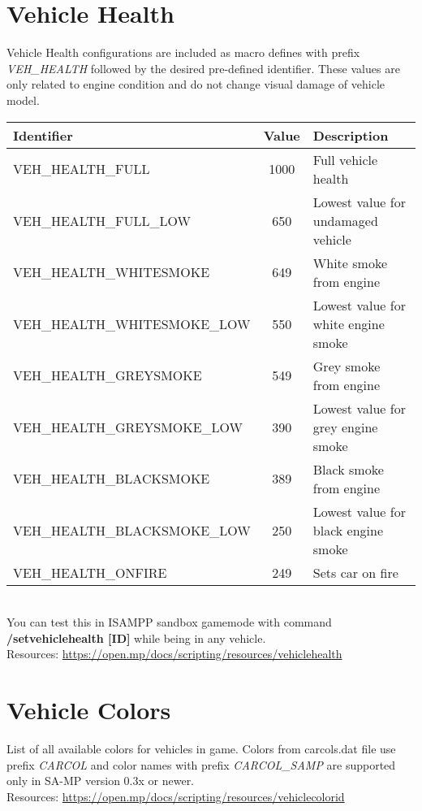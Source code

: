 \documentclass{article}
\begin{document}
\section{Vehicle Health}
\begin{sloppypar}
Vehicle Health configurations are included as macro defines with prefix \textit{VEH\_HEALTH} followed by the desired pre-defined identifier. These values are only related to engine condition and do not change visual damage of vehicle model.
\end{sloppypar}
\bigskip
\noindent\begin{tabular}{ |l|c|l| } 
\hline
Identifier & Value & Description \\
\hline
VEH\_HEALTH\_FULL & 1000 & Full vehicle health \\ 
VEH\_HEALTH\_FULL\_LOW & 650 &  Lowest value for undamaged vehicle \\ 
VEH\_HEALTH\_WHITESMOKE & 649 & White smoke from engine \\ 
VEH\_HEALTH\_WHITESMOKE\_LOW & 550 & Lowest value for white engine smoke \\ 
VEH\_HEALTH\_GREYSMOKE & 549 & Grey smoke from engine \\ 
VEH\_HEALTH\_GREYSMOKE\_LOW & 390 & Lowest value for grey engine smoke\\ 
VEH\_HEALTH\_BLACKSMOKE & 389 & Black smoke from engine \\ 
VEH\_HEALTH\_BLACKSMOKE\_LOW & 250 & Lowest value for black engine smoke \\ 
VEH\_HEALTH\_ONFIRE & 249 & Sets car on fire \\
\hline
\end{tabular}
\bigskip
\\You can test this in ISAMPP sandbox gamemode with command \textbf{/setvehiclehealth [ID]} while being in any vehicle.
\bigskip
\\Resources: \url{https://open.mp/docs/scripting/resources/vehiclehealth}

\section{Vehicle Colors}
List of all available colors for vehicles in game. Colors from carcols.dat file use prefix \textit{CARCOL} and color names with prefix \textit{CARCOL\_SAMP} are supported only in SA-MP version 0.3x or newer.
\bigskip
\\Resources: \url{https://open.mp/docs/scripting/resources/vehiclecolorid}
\end{document}
